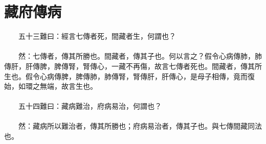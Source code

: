 \section{藏府傳病}

　　五十三難曰：經言七傳者死，間藏者生，何謂也？
\\\\
　　然：七傳者，傳其所勝也。間藏者，傳其子也。何以言之？假令心病傳肺，肺傳肝，肝傳脾，脾傳腎，腎傳心，一藏不再傷，故言七傳者死也。間藏者，傳其所生也。假令心病傳脾，脾傳肺，肺傳腎，腎傳肝，肝傳心，是母子相傳，竟而復始，如環之無端，故言生也。
\\\\
　　五十四難曰：藏病難治，府病易治，何謂也？
\\\\
　　然：藏病所以難治者，傳其所勝也；府病易治者，傳其子也。與七傳間藏同法也。